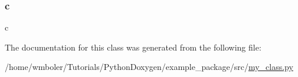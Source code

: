\mbox{\label{classsrc_1_1my__class_1_1MyClass_ae0323a9039add2978bf5b49550572c7c}} 
\subsubsection{\texorpdfstring{c}{c}}
{\footnotesize\ttfamily c}



The documentation for this class was generated from the following file\+:\begin{DoxyCompactItemize}
\item 
/home/wmboler/\+Tutorials/\+Python\+Doxygen/example\+\_\+package/src/\hyperlink{my__class_8py}{my\+\_\+class.\+py}\end{DoxyCompactItemize}
